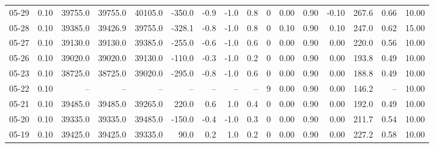 \begin{threeparttable}
{\begin{tabular}{lrrrrrrrrrrrrrrr}
  05-29 &     0.10 & 39755.0 & 39755.0 & 40105.0 &     -350.0 &           -0.9 &                     -1.0 &                 0.8 &              0 &       0.00 &      0.90 &          -0.10 &            267.6 &            0.66 &                  10.00 \\
  05-28 &     0.10 & 39385.0 & 39426.9 & 39755.0 &     -328.1 &           -0.8 &                     -1.0 &                 0.8 &              0 &       0.10 &      0.90 &           0.10 &            247.0 &            0.62 &                  15.00 \\
  05-27 &     0.10 & 39130.0 & 39130.0 & 39385.0 &     -255.0 &           -0.6 &                     -1.0 &                 0.6 &              0 &       0.00 &      0.90 &           0.00 &            220.0 &            0.56 &                  10.00 \\
  05-26 &     0.10 & 39020.0 & 39020.0 & 39130.0 &     -110.0 &           -0.3 &                     -1.0 &                 0.2 &              0 &       0.00 &      0.90 &           0.00 &            193.8 &            0.49 &                  10.00 \\
  05-23 &     0.10 & 38725.0 & 38725.0 & 39020.0 &     -295.0 &           -0.8 &                     -1.0 &                 0.6 &              0 &       0.00 &      0.90 &           0.00 &            188.8 &            0.49 &                  10.00 \\
  05-22 &     0.10 &      -- &      -- &      -- &         -- &             -- &                       -- &                  -- &              9 &       0.00 &      0.90 &           0.00 &            146.2 &              -- &                  10.00 \\
  05-21 &     0.10 & 39485.0 & 39485.0 & 39265.0 &      220.0 &            0.6 &                      1.0 &                 0.4 &              0 &       0.00 &      0.90 &           0.00 &            192.0 &            0.49 &                  10.00 \\
  05-20 &     0.10 & 39335.0 & 39335.0 & 39485.0 &     -150.0 &           -0.4 &                     -1.0 &                 0.3 &              0 &       0.00 &      0.90 &           0.00 &            211.7 &            0.54 &                  10.00 \\
  05-19 &     0.10 & 39425.0 & 39425.0 & 39335.0 &       90.0 &            0.2 &                      1.0 &                 0.2 &              0 &       0.00 &      0.90 &           0.00 &            227.2 &            0.58 &                  10.00 \\

\end{tabular}}
\end{threeparttable}
